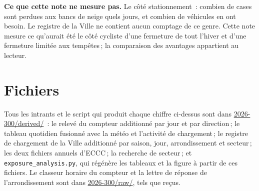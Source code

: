 \documentclass[11pt,letterpaper]{article}
\newcommand{\repourl}{https://github.com/OpenMobilityData/Terrebonne-access-requests}
\newcommand{\doc}[2]{\href{\repourl/blob/main/#1}{#2}}
\begin{document}
\textbf{Ce que cette note ne mesure pas.} Le côté stationnement~: combien
de cases sont perdues aux bancs de neige quels jours, et combien de
véhicules en ont besoin. Le registre de la Ville ne contient aucun
comptage de ce genre. Cette note mesure ce qu'aurait été le côté cycliste
d'une fermeture de tout l'hiver et d'une fermeture limitée aux
tempêtes\,; la comparaison des avantages appartient au lecteur.

\section{Fichiers}

Tous les intrants et le script qui produit chaque chiffre ci-dessus sont
dans \doc{2026-300/derived/}{2026-300/derived/}~: le relevé du compteur
additionné par jour et par direction\,; le tableau quotidien fusionné avec
la météo et l'activité de chargement\,; le registre de chargement de la
Ville additionné par saison, jour, arrondissement et secteur\,; les deux
fichiers annuels d'ECCC\,; la recherche de secteur\,; et
\texttt{exposure\_analysis.py}, qui régénère les tableaux et la figure à
partir de ces fichiers. Le classeur horaire du compteur et la lettre de
réponse de l'arrondissement sont dans \doc{2026-300/raw/}{2026-300/raw/},
tels que reçus.
\end{document}
